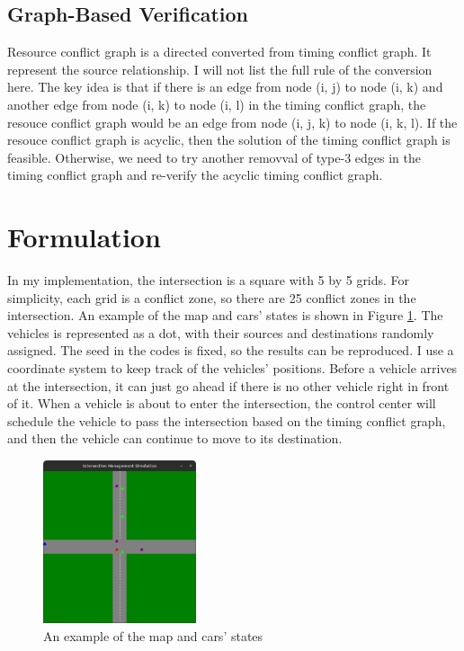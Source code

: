 \documentclass{article}
\begin{document}
\begin{multicols*}{1}
    \subsection{Graph-Based Verification}
    Resource conflict graph is a directed converted from timing conflict graph. It represent the source relationship. I will not list the full rule of the conversion here. The key idea is that if there is an edge from node (i, j) to node (i, k) and another edge from node (i, k) to node (i, l) in the timing conflict graph, the resouce conflict graph would be an edge from node (i, j, k) to node (i, k, l). If the resouce conflict graph is acyclic, then the solution of the timing conflict graph is feasible. Otherwise, we need to try another removval of type-3 edges in the timing conflict graph and re-verify the acyclic timing conflict graph.

    \section{Formulation}
    In my implementation, the intersection is a square with 5 by 5 grids. For simplicity, each grid is a conflict zone, so there are 25 conflict zones in the intersection. An example of the map and cars' states is shown in Figure \ref{fig:map}. The vehicles is represented as a dot, with their sources and destinations randomly assigned. The seed in the codes is fixed, so the results can be reproduced. I use a coordinate system to keep track of the vehicles' positions. Before a vehicle arrives at the intersection, it can just go ahead if there is no other vehicle right in front of it. When a vehicle is about to enter the intersection, the control center will schedule the vehicle to pass the intersection based on the timing conflict graph, and then the vehicle can continue to move to its destination.
    \begin{figure}[H]
        \centering
        \includegraphics[width=0.4\textwidth]{images/map.png}
        \caption{An example of the map and cars' states}
        \label{fig:map}
    \end{figure}


\end{multicols*}
\end{document}
